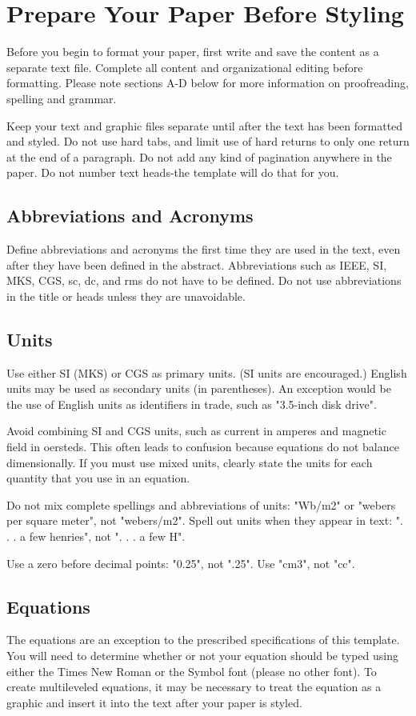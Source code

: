 \documentclass[10pt, conference, compsocconf]{IEEEtran}
\begin{document}
\section{Prepare Your Paper Before Styling}
Before you begin to format your paper, first write and save the content as a separate text file. Complete all content and organizational editing before formatting. Please note sections A-D below for more information on proofreading, spelling and grammar.

Keep your text and graphic files separate until after the text has been formatted and styled. Do not use hard tabs, and limit use of hard returns to only one return at the end of a paragraph. Do not add any kind of pagination anywhere in the paper. Do not number text heads-the template will do that for you.

\subsection{Abbreviations and Acronyms}
Define abbreviations and acronyms the first time they are used in the text, even after they have been defined in the abstract. Abbreviations such as IEEE, SI, MKS, CGS, sc, dc, and rms do not have to be defined. Do not use abbreviations in the title or heads unless they are unavoidable.

\subsection{Units}
Use either SI (MKS) or CGS as primary units. (SI units are encouraged.) English units may be used as secondary units (in parentheses). An exception would be the use of English units as identifiers in trade, such as "3.5-inch disk drive".

Avoid combining SI and CGS units, such as current in amperes and magnetic field in oersteds. This often leads to confusion because equations do not balance dimensionally. If you must use mixed units, clearly state the units for each quantity that you use in an equation.

Do not mix complete spellings and abbreviations of units: "Wb/m2" or "webers per square meter", not "webers/m2".  Spell out units when they appear in text: ". . . a few henries", not ". . . a few H".

Use a zero before decimal points: "0.25", not ".25". Use "cm3", not "cc".

\subsection{Equations}
The equations are an exception to the prescribed specifications of this template. You will need to determine whether or not your equation should be typed using either the Times New Roman or the Symbol font (please no other font). To create multileveled equations, it may be necessary to treat the equation as a graphic and insert it into the text after your paper is styled.
\end{document}
